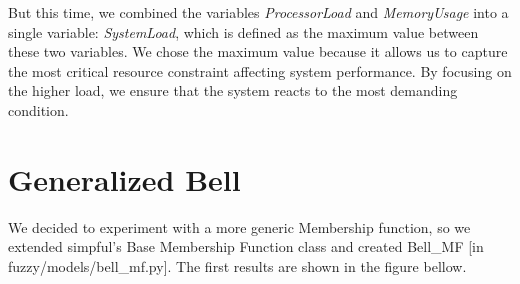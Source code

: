 \documentclass[11pt]{report}
\begin{document}
But this time, we combined the variables \textit{ProcessorLoad} and \textit{MemoryUsage} into a single variable: \textit{SystemLoad}, which is defined as the maximum value between these two variables. We chose the maximum value because it allows us to capture the most critical resource constraint affecting system performance. By focusing on the higher load, we ensure that the system reacts to the most demanding condition.

\section{Generalized Bell}
We decided to experiment with a more generic Membership function, so we
extended simpful's Base Membership Function class and created Bell\_MF [in fuzzy/models/bell\_mf.py].
The first results are shown in the figure bellow.
\end{document}
